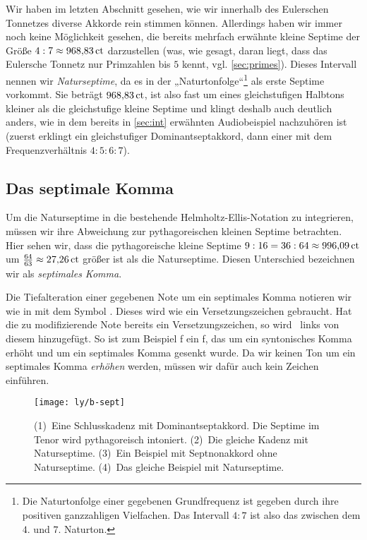 Wir haben im letzten Abschnitt gesehen, wie wir innerhalb des Eulerschen
Tonnetzes diverse Akkorde rein stimmen können.  Allerdings haben wir immer noch
keine Möglichkeit gesehen, die bereits mehrfach erwähnte kleine Septime der
Größe $4:7\approx 968{,}83\,\mathrm{ct}$ darzustellen (was, wie gesagt, daran liegt,
dass das Eulersche Tonnetz nur Primzahlen bis $5$ kennt,
vgl. \cref{sec:primes}). Dieses Intervall nennen wir \emph{Naturseptime}, da es
in der „Naturtonfolge“\footnote{Die Naturtonfolge einer gegebenen Grundfrequenz
  ist gegeben durch ihre positiven ganzzahligen Vielfachen. Das Intervall $4:7$
  ist also das zwischen dem $4$. und $7$. Naturton.} als erste Septime vorkommt.
Sie beträgt $968{,}83\,\mathrm{ct}$, ist also fast um  eines
gleichstufigen Halbtons kleiner als die gleichstufige kleine Septime und klingt
deshalb auch deutlich anders, wie in dem bereits in \cref{sec:int} erwähnten
Audiobeispiel nachzuhören ist (zuerst erklingt ein gleichstufiger
Dominantseptakkord, dann einer mit dem Frequenzverhältnis $4:5:6:7$).

\subsection{Das septimale Komma}

Um die Naturseptime in die bestehende Helmholtz-Ellis-Notation zu integrieren,
müssen wir ihre Abweichung zur pythagoreischen kleinen Septime betrachten.  Hier
sehen wir, dass die pythagoreische kleine Septime
$9:16=36:64\approx 996{,}09\,\mathrm{ct}$ um $\frac{64}{63}\approx 27{,}26\,\mathrm{ct}$
größer ist als die Naturseptime. Diesen Unterschied bezeichnen wir als
\emph{septimales Komma}.

Die Tiefalteration einer gegebenen Note um ein septimales Komma notieren wir wie
in \cite{HEJI} mit dem Symbol \septimal.  Dieses wird wie ein Versetzungszeichen
gebraucht. Hat die zu modifizierende Note bereits ein Versetzungszeichen, so
wird \septimal\ links von diesem hinzugefügt. So ist zum Beispiel
\septimal\naturalp f ein f, das um ein syntonisches Komma erhöht und um ein
septimales Komma gesenkt wurde. Da wir keinen Ton um ein septimales Komma
\emph{erhöhen} werden, müssen wir dafür auch kein Zeichen
einführen.%

\begin{figure}
  \centering
  \texttt{[image: ly/b-sept]}
  \caption{(1)~Eine Schlusskadenz mit Dominantseptakkord. Die Septime im
    Tenor wird pythagoreisch intoniert.
    \quad(2)~Die gleiche Kadenz mit Naturseptime.
    \quad(3)~Ein Beispiel mit Septnonakkord ohne Naturseptime.
    \quad(4)~Das gleiche Beispiel mit Naturseptime.}\label{fig:sept}
\end{figure}

